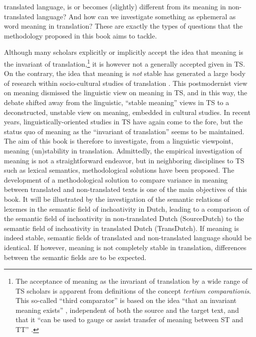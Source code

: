 translated language, is or becomes (slightly) different from its meaning in non-translated language? And how can we investigate something as ephemeral as word meaning in translation? These are exactly the types of questions that the methodology proposed in this book aims to tackle.

Although many scholars explicitly or implicitly accept the idea that meaning is the invariant of translation,\footnote{The acceptance of meaning as the invariant of translation by a wide range of TS scholars is apparent from definitions of the concept \textit{tertium} \textit{comparationis}. This so-called ``third comparator'' is based on the idea “that an invariant meaning exists” \citep[31]{HatimMunday2004}, independent of both the source and the target text, and that it “can be used to gauge or assist transfer of meaning between ST and TT” \citep[31]{HatimMunday2004}.} it is however not a generally accepted given in TS. On the contrary, the idea that meaning is \textit{not} stable has generated a large body of research within socio-cultural studies of translation  \citep{baumgarten_ideology_2012}. This postmodernist view on meaning dismissed the linguistic view on meaning in TS, and in this way, the debate shifted away from the linguistic, “stable meaning” views in TS to a deconstructed, unstable view on meaning, embedded in cultural studies. In recent years, linguistically-oriented studies in TS have again come to the fore, but the status quo of meaning as the “invariant of translation” seems to be maintained. The aim of this book is therefore to investigate, from a linguistic viewpoint, meaning (un)stability in translation. Admittedly, the empirical investigation of meaning is not a straightforward endeavor, but in neighboring disciplines to TS such as lexical semantics, methodological solutions have been proposed. The development of a methodological solution to compare variance in meaning between translated and non-translated texts is one of the main objectives of this book. It will be illustrated by the investigation of the semantic relations of lexemes in the semantic field of inchoativity in Dutch, leading to a comparison of the semantic field of inchoativity in non-translated Dutch (SourceDutch) to the semantic field of inchoativity in translated Dutch (TransDutch). If meaning is indeed stable, semantic fields of translated and non-translated language should be identical. If however, meaning is not completely stable in translation, differences between the semantic fields are to be expected. 


